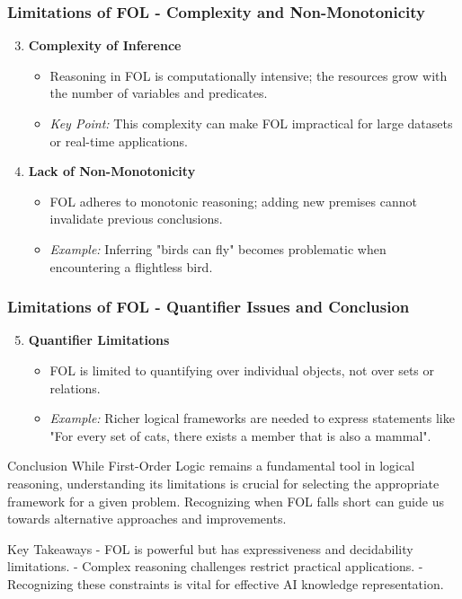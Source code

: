 \documentclass[aspectratio=169]{beamer}
\begin{document}
\begin{frame}[fragile]
    \frametitle{Limitations of FOL - Complexity and Non-Monotonicity}
    \begin{enumerate}
        \setcounter{enumi}{2} %
        \item \textbf{Complexity of Inference}
        \begin{itemize}
            \item Reasoning in FOL is computationally intensive; the resources grow with the number of variables and predicates.
            \item \textit{Key Point:} This complexity can make FOL impractical for large datasets or real-time applications.
        \end{itemize}
        
        \item \textbf{Lack of Non-Monotonicity}
        \begin{itemize}
            \item FOL adheres to monotonic reasoning; adding new premises cannot invalidate previous conclusions.
            \item \textit{Example:} Inferring "birds can fly" becomes problematic when encountering a flightless bird.
        \end{itemize}
    \end{enumerate}
\end{frame}

\begin{frame}[fragile]
    \frametitle{Limitations of FOL - Quantifier Issues and Conclusion}
    \begin{enumerate}
        \setcounter{enumi}{4} %
        \item \textbf{Quantifier Limitations}
        \begin{itemize}
            \item FOL is limited to quantifying over individual objects, not over sets or relations.
            \item \textit{Example:} Richer logical frameworks are needed to express statements like "For every set of cats, there exists a member that is also a mammal".
        \end{itemize}
    \end{enumerate}
    
    \begin{block}{Conclusion}
        While First-Order Logic remains a fundamental tool in logical reasoning, understanding its limitations is crucial for selecting the appropriate framework for a given problem. Recognizing when FOL falls short can guide us towards alternative approaches and improvements.
    \end{block}
    
    \begin{block}{Key Takeaways}
        - FOL is powerful but has expressiveness and decidability limitations.
        - Complex reasoning challenges restrict practical applications.
        - Recognizing these constraints is vital for effective AI knowledge representation.
    \end{block}
\end{frame}
\end{document}
